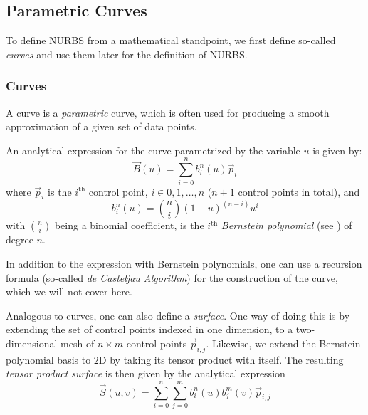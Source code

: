 \subsection{Parametric Curves}
\label{subsec:paracurves}

To define NURBS from a mathematical standpoint, we first define so-called \emph{\Bez curves} and use them later for the definition of NURBS. 
\subsubsection{\Bez Curves}
A \Bez curve is a \textit{parametric} curve, which is often used for producing a smooth approximation of a given set of data points.
 
An analytical expression for the \Bez curve parametrized by the variable $u$ is given by:
\begin{equation*}
\vec{B}(u)=\sum\limits_{i=0}^n b_i^n(u) \vec{p}_i
\end{equation*}
where $\vec{p}_i$ is the $i^{\text{th}}$ control point, $i\in0,1, \dots ,n$ ($n+1$ control points in total), and
\begin{equation*}
b_i^n(u)=\binom{n}{i}(1-u)^{(n-i)}u^i
\end{equation*}
with $\binom{n}{i}$ being a binomial coefficient, is the $i^{\text{th}}$ \emph{Bernstein polynomial} (see \cite{lorentz2012bernstein}) of degree $n$.

In addition to the expression with Bernstein polynomials, one can use a recursion formula (so-called \emph{de Casteljau Algorithm}) for the construction of the \Bez curve, which we will not cover here. 

Analogous to \Bez curves, one can also define a \textit{\Bez surface}. One way of doing this is by extending the set of control points indexed in one dimension, to a two-dimensional mesh of $n\times m$ control points $\vec{p}_{i,j}$. Likewise, we extend the Bernstein polynomial basis to $2$D by taking its tensor product with itself. The resulting \textit{tensor product \Bez surface} is then given by the analytical expression
\begin{equation}
\label{eq:bezsurface}
\vec{S}(u,v)=\sum\limits_{i=0}^n \sum\limits_{j=0}^m b_i^n(u) b_j^m(v) \vec{p}_{i,j}
\end{equation}

